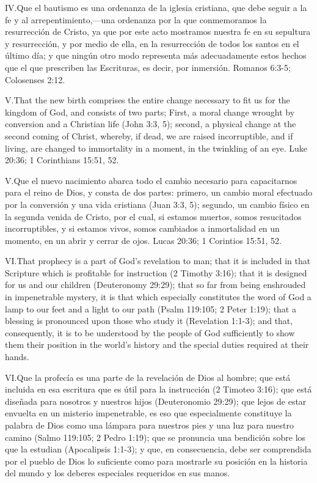 \lettrine{IV.} Que el bautismo es una ordenanza de la iglesia cristiana, que debe seguir a la fe y al arrepentimiento,—una ordenanza por la que conmemoramos la resurrección de Cristo, ya que por este acto mostramos nuestra fe en su sepultura y resurrección, y por medio de ella, en la resurrección de todos los santos en el último día; y que ningún otro modo representa más adecuadamente estos hechos que el que prescriben las Escrituras, es decir, por inmersión. Romanos 6:3-5; Colosenses 2:12.


\lettrine{V.} That the new birth comprises the entire change necessary to fit us for the kingdom of God, and consists of two parts; First, a moral change wrought by conversion and a Christian life (John 3:3, 5); second, a physical change at the second coming of Christ, whereby, if dead, we are raised incorruptible, and if living, are changed to immortality in a moment, in the twinkling of an eye. Luke 20:36; 1 Corinthians 15:51, 52.


\lettrine{V.} Que el nuevo nacimiento abarca todo el cambio necesario para capacitarnos para el reino de Dios, y consta de dos partes: primero, un cambio moral efectuado por la conversión y una vida cristiana (Juan 3:3, 5); segundo, un cambio físico en la segunda venida de Cristo, por el cual, si estamos muertos, somos resucitados incorruptibles, y si estamos vivos, somos cambiados a inmortalidad en un momento, en un abrir y cerrar de ojos. Lucas 20:36; 1 Corintios 15:51, 52.


\lettrine{VI.} That prophecy is a part of God’s revelation to man; that it is included in that Scripture which is profitable for instruction (2 Timothy 3:16); that it is designed for us and our children (Deuteronomy 29:29); that so far from being enshrouded in impenetrable mystery, it is that which especially constitutes the word of God a lamp to our feet and a light to our path (Psalm 119:105; 2 Peter 1:19); that a blessing is pronounced upon those who study it (Revelation 1:1-3); and that, consequently, it is to be understood by the people of God sufficiently to show them their position in the world’s history and the special duties required at their hands.


\lettrine{VI.} Que la profecía es una parte de la revelación de Dios al hombre; que está incluida en esa escritura que es útil para la instrucción (2 Timoteo 3:16); que está diseñada para nosotros y nuestros hijos (Deuteronomio 29:29); que lejos de estar envuelta en un misterio impenetrable, es eso que especialmente constituye la palabra de Dios como una lámpara para nuestros pies y una luz para nuestro camino (Salmo 119:105; 2 Pedro 1:19); que se pronuncia una bendición sobre los que la estudian (Apocalipsis 1:1-3); y que, en consecuencia, debe ser comprendida por el pueblo de Dios lo suficiente como para mostrarle su posición en la historia del mundo y los deberes especiales requeridos en sus manos.


